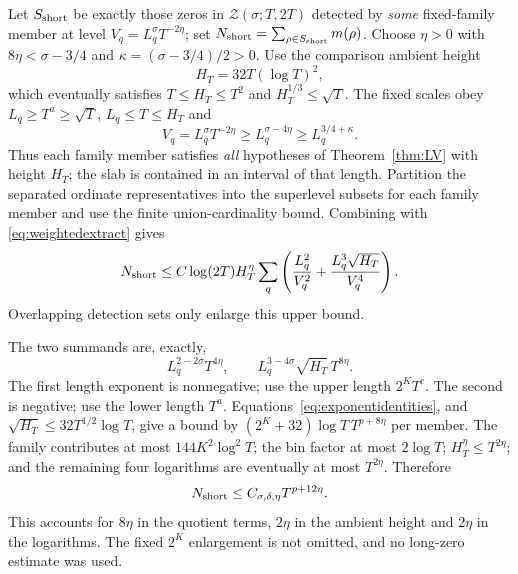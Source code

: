 \documentclass[11pt,a4paper]{article}
\numberwithin{equation}{section}
\theoremstyle{definition}
\begin{document}
Let $S_{\rm short}$ be exactly those zeros in $\mathcal Z(\sigma;T,2T)$
detected by \emph{some} fixed-family member at level
$V_q=L_q^\sigma T^{-2\eta}$; set
$N_{\rm short}=\sum_{\rho\in S_{\rm short}}m(\rho)$.
Choose $\eta>0$ with $8\eta<\sigma-3/4$ and
$\kappa=(\sigma-3/4)/2>0$.
Use the comparison ambient height
\[
 H_T=32T(\log T)^2,
\]
which eventually satisfies $T\le H_T\le T^2$ and $H_T^{1/3}\le\sqrt T$.
The fixed scales obey $L_q\ge T^a\ge\sqrt T$, $L_q\le T\le H_T$ and
\[
 V_q=L_q^\sigma T^{-2\eta}\ge L_q^{\sigma-4\eta}
                                     \ge L_q^{3/4+\kappa}.
\]
Thus each family member satisfies \emph{all} hypotheses of Theorem~\ref{thm:LV}
with height $H_T$; the slab is contained in an interval of that length.
Partition the separated ordinate representatives into the superlevel subsets
for each family member and use the finite union-cardinality bound.
Combining with \eqref{eq:weightedextract} gives
\begin{equation*}
 N_{\rm short}\le C\log(2T)H_T^\eta
       \sum_q\left(\frac{L_q^2}{V_q^2}+\frac{L_q^3\sqrt{H_T}}{V_q^4}\right).
\end{equation*}
Overlapping detection sets only enlarge this upper bound.

The two summands are, exactly,
\[
 L_q^{2-2\sigma}T^{4\eta},\qquad
 L_q^{3-4\sigma}\sqrt{H_T}\,T^{8\eta}.
\]
The first length exponent is nonnegative; use the upper length
$2^KT^c$. The second is negative; use the lower length $T^a$.
Equations~\eqref{eq:exponentidentities}, and
$\sqrt{H_T}\le32T^{1/2}\log T$, give a bound by
$(2^K+32)\log T\,T^{p+8\eta}$ per member.
The family contributes at most $144K^2\log^2T$; the bin factor at most
$2\log T$; $H_T^\eta\le T^{2\eta}$; and the remaining four logarithms
are eventually at most $T^{2\eta}$. Therefore
\begin{equation}\label{eq:shortcount}
 N_{\rm short}\le C_{\sigma,\delta,\eta}T^{p+12\eta}.
\end{equation}
This accounts for $8\eta$ in the quotient terms, $2\eta$ in the ambient
height and $2\eta$ in the logarithms. The fixed $2^K$ enlargement is not
omitted, and no long-zero estimate was used.
\end{document}
